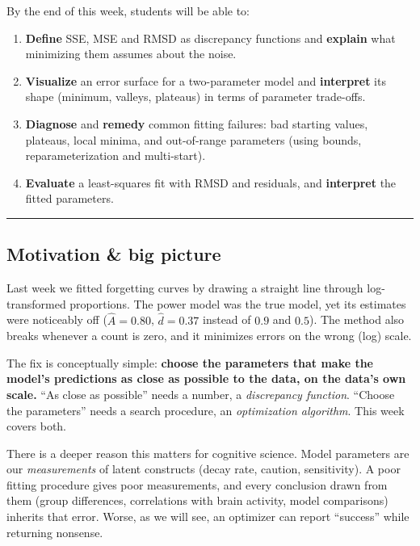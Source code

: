 By the end of this week, students will be able to:

\begin{enumerate}
\def\labelenumi{\arabic{enumi}.}
\tightlist
\item
  \textbf{Define} SSE, MSE and RMSD as discrepancy functions and
  \textbf{explain} what minimizing them assumes about the noise.
\item
  \textbf{Visualize} an error surface for a two-parameter model and
  \textbf{interpret} its shape (minimum, valleys, plateaus) in terms of
  parameter trade-offs.
\item
  \textbf{Diagnose} and \textbf{remedy} common fitting failures: bad
  starting values, plateaus, local minima, and out-of-range parameters
  (using bounds, reparameterization and multi-start).
\item
  \textbf{Evaluate} a least-squares fit with RMSD and residuals, and
  \textbf{interpret} the fitted parameters.
\end{enumerate}

\begin{center}\rule{0.5\linewidth}{0.5pt}\end{center}

\subsection{Motivation \& big picture}

Last week we fitted forgetting curves by drawing a straight line through
log-transformed proportions. The power model was the true model, yet its
estimates were noticeably off (\(\hat A = 0.80\), \(\hat d = 0.37\)
instead of \(0.9\) and \(0.5\)). The method also breaks whenever a count
is zero, and it minimizes errors on the wrong (log) scale.

The fix is conceptually simple: \textbf{choose the parameters that make
the model's predictions as close as possible to the data, on the data's
own scale.} ``As close as possible'' needs a number, a \emph{discrepancy
function}. ``Choose the parameters'' needs a search procedure, an
\emph{optimization algorithm}. This week covers both.

There is a deeper reason this matters for cognitive science. Model
parameters are our \emph{measurements} of latent constructs (decay rate,
caution, sensitivity). A poor fitting procedure gives poor measurements,
and every conclusion drawn from them (group differences, correlations
with brain activity, model comparisons) inherits that error. Worse, as
we will see, an optimizer can report ``success'' while returning
nonsense.

